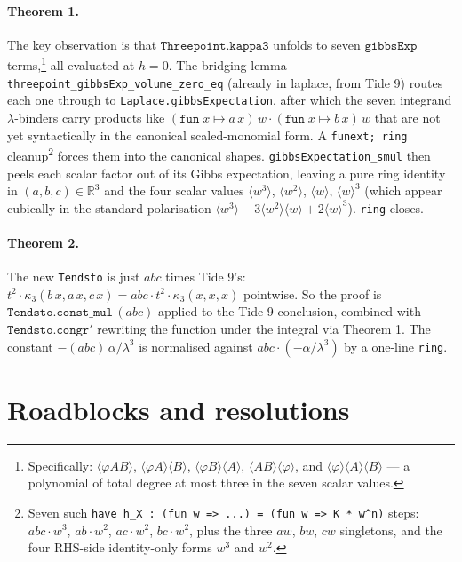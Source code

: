 \documentclass[11pt]{article}
\begin{document}
\paragraph{Theorem 1.} The key observation is that
$\mathtt{Threepoint.kappa3}$ unfolds to seven $\mathtt{gibbsExp}$
terms,\footnote{Specifically: $\langle\varphi A B\rangle$,
$\langle\varphi A\rangle\langle B\rangle$,
$\langle\varphi B\rangle\langle A\rangle$,
$\langle A B\rangle\langle\varphi\rangle$, and
$\langle\varphi\rangle\langle A\rangle\langle B\rangle$ — a polynomial
of total degree at most three in the seven scalar values.} all
evaluated at $h = 0$. The bridging lemma
\texttt{threepoint\_gibbsExp\_volume\_zero\_eq} (already in laplace,
from Tide 9) routes each one through to
\texttt{Laplace.gibbsExpectation}, after which the seven integrand
$\lambda$-binders carry products like
$(\mathtt{fun}\;x \mapsto a\,x)\,w \cdot (\mathtt{fun}\;x \mapsto b\,x)\,w$
that are not yet syntactically in the canonical scaled-monomial form.
A \texttt{funext;\,ring} cleanup\footnote{Seven such
\texttt{have h\_X : (fun w => ...) = (fun w => K * w\^{}n)} steps:
$abc \cdot w^3$, $ab \cdot w^2$, $ac \cdot w^2$, $bc \cdot w^2$, plus
the three $a w$, $b w$, $c w$ singletons, and the four RHS-side
identity-only forms $w^3$ and $w^2$.} forces them into the canonical
shapes. \texttt{gibbsExpectation\_smul} then peels each scalar factor
out of its Gibbs expectation, leaving a pure ring identity in
$(a, b, c) \in \mathbb{R}^3$ and the four scalar values
$\langle w^3 \rangle$, $\langle w^2 \rangle$, $\langle w \rangle$, $\langle w \rangle^3$
(which appear cubically in the standard polarisation
$\langle w^3 \rangle - 3\langle w^2\rangle\langle w\rangle + 2\langle w\rangle^3$).
\texttt{ring} closes.

\paragraph{Theorem 2.} The new \texttt{Tendsto} is just $abc$ times
Tide 9's: $t^2 \cdot \kappa_3(b\,x, a\,x, c\,x) = abc \cdot t^2 \cdot \kappa_3(x, x, x)$
pointwise. So the proof is
$\mathtt{Tendsto.const\_mul}\,(abc)$ applied to the Tide 9 conclusion,
combined with $\mathtt{Tendsto.congr'}$ rewriting the function under
the integral via Theorem 1. The constant
$-(a b c)\,\alpha/\lambda^3$ is normalised against
$abc \cdot (-\alpha/\lambda^3)$ by a one-line \texttt{ring}.

\section{Roadblocks and resolutions}
\end{document}
